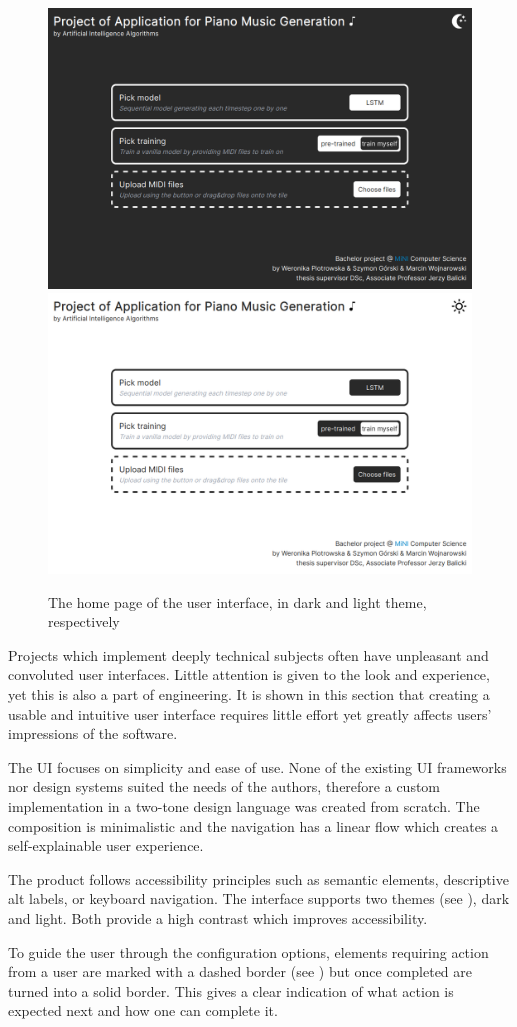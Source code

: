 \documentclass[a4paper, 11pt, twoside]{report}
\theoremstyle{definition}
\begin{document}
\begin{figure}[!t]
    \centering
    \includegraphics[width=0.7\linewidth]{gui_dark.png}
    \includegraphics[width=0.7\linewidth]{gui_light.png}
    \caption{The home page of the user interface, in dark and light theme, respectively}
    \label{fig:gui_home}
\end{figure}

Projects which implement deeply technical subjects often have unpleasant and convoluted user interfaces. Little attention is given to the look and experience, yet this is also a part of engineering. It is shown in this section that creating a usable and intuitive user interface requires little effort yet greatly affects users' impressions of the software. \par
The UI focuses on simplicity and ease of use. None of the existing UI frameworks nor design systems suited the needs of the authors, therefore a custom implementation in a two-tone design language was created from scratch. The composition is minimalistic and the navigation has a linear flow which creates a self-explainable user experience. \par
The product follows accessibility principles such as semantic elements, descriptive alt labels, or keyboard navigation. The interface supports two themes (see ), dark and light. Both provide a high contrast which improves accessibility. \par
To guide the user through the configuration options, elements requiring action from a user are marked with a dashed border (see ) but once completed are turned into a solid border. This gives a clear indication of what action is expected next and how one can complete it. \par
\end{document}
